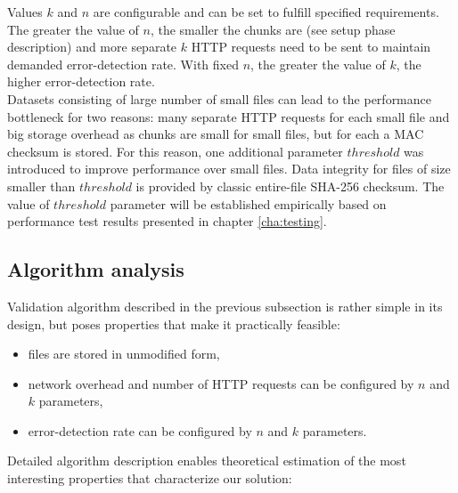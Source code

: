 Values $k$ and $n$ are configurable and can be set to fulfill specified 
requirements. The greater the value of $n$, the smaller the chunks are (see
setup phase description) and more separate $k$ HTTP requests need to be sent to
maintain demanded error-detection rate. With fixed $n$, the greater the value
of $k$, the higher error-detection rate.\\

Datasets consisting of large number of small files can lead to the performance 
bottleneck for two reasons: many separate HTTP requests for each small file and
big storage overhead as chunks are small for small files, but for each a MAC
checksum is stored. For this reason, one additional parameter $threshold$ was 
introduced to improve performance over small files. Data integrity for files
of size smaller than $threshold$ is provided by classic entire-file SHA-256 
checksum. The value of $threshold$ parameter will be established empirically
based on performance test results presented in chapter \ref{cha:testing}.

\subsection{Algorithm analysis}
\label{algorithm-analysis}
Validation algorithm described in the previous subsection is rather simple in 
its design, but poses properties that make it practically feasible:

\begin{itemize}
	\item files are stored in unmodified form,
	\item network overhead and number of HTTP requests can be configured by 
	$n$ and $k$ parameters,
	\item error-detection rate can be configured by $n$ and $k$ parameters.
\end{itemize}

Detailed algorithm description enables theoretical estimation of the most
interesting properties that characterize our solution:

